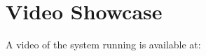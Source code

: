 \chapter{Video Showcase}
\label{chap:videoshowcase}

A video of the system running is available at: \\